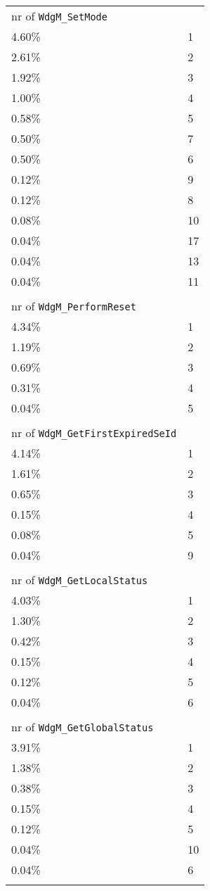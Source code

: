 \begin{longtable}{l l}
nr of \verb!WdgM_SetMode!\\
4.60\% & 1\\
2.61\% & 2\\
1.92\% & 3\\
1.00\% & 4\\
0.58\% & 5\\
0.50\% & 7\\
0.50\% & 6\\
0.12\% & 9\\
0.12\% & 8\\
0.08\% & 10\\
0.04\% & 17\\
0.04\% & 13\\
0.04\% & 11\\\\

nr of \verb!WdgM_PerformReset!\\
4.34\% & 1\\
1.19\% & 2\\
0.69\% & 3\\
0.31\% & 4\\
0.04\% & 5\\\\

nr of \verb!WdgM_GetFirstExpiredSeId!\\
4.14\% & 1\\
1.61\% & 2\\
0.65\% & 3\\
0.15\% & 4\\
0.08\% & 5\\
0.04\% & 9\\\\

nr of \verb!WdgM_GetLocalStatus!\\
4.03\% & 1\\
1.30\% & 2\\
0.42\% & 3\\
0.15\% & 4\\
0.12\% & 5\\
0.04\% & 6\\\\

nr of \verb!WdgM_GetGlobalStatus!\\
3.91\% & 1\\
1.38\% & 2\\
0.38\% & 3\\
0.15\% & 4\\
0.12\% & 5\\
0.04\% & 10\\
0.04\% & 6\\\\


\end{longtable}
